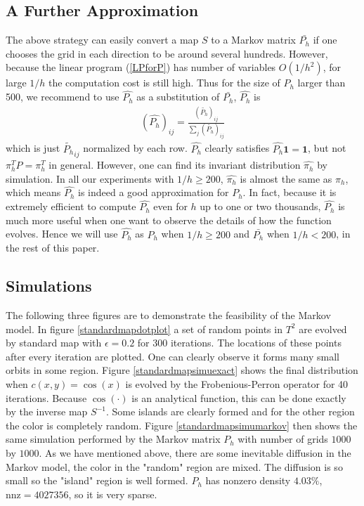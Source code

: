 \documentclass{article}
\begin{document}
\subsection{A Further Approximation}

The above strategy can easily convert a map $S$  to a Markov matrix
$\bar{P_h}$ if one chooses the grid in each direction to be around
several hundreds. However, because the linear program (\ref{LPforP})
has number of variables $O(1/h^2)$, for large $1/h$ the computation cost
is still high. Thus for the size of $P_h$ larger than 500, we
recommend to use $\hat{P_h}$ as a substitution of $\bar{P_h}$,
$\hat{P_h}$ is
 \begin{eqnarray}
    (\hat{P_h})_{ij}  = \frac{(\tilde{P_h})_{ij}}{\sum_j (\tilde{P_h})_{ij} }
 \end{eqnarray}
which is just $\tilde{P_h}_{ij}$ normalized by each row. $\hat{P_h}$
clearly satisfies  $\hat{P_h} \mathbf{1}  = \mathbf{1}$, but not
$\pi_h^T \hat{P} = \pi_h^T$ in general. However, one can find its
invariant distribution $\hat{\pi_h}$ by simulation. In all our
experiments with $1/h \geq 200$, $\hat{\pi_h}$ is almost the same as
$\pi_h$, which means $\hat{P_h}$ is indeed a good approximation for
$P_h$. In fact, because it is extremely efficient to compute
$\hat{P_h}$ even for $h$ up to one or two thousands, $\hat{P_h}$ is
much more useful when one want to observe the details of how the
function evolves. Hence we will use $\hat{P_h}$ as $P_h$ when $1/h
\geq 200$ and $\bar{P_h}$ when $1/h < 200$, in the rest of this paper.

\subsection{Simulations}

The following three figures are to demonstrate the feasibility of
the Markov model. In figure \ref{standardmapdotplot} a set of random
points in $T^2$ are evolved by standard map with $\epsilon=0.2$ for
300 iterations. The locations of these points after every iteration
are plotted. One can clearly observe it forms many small orbits in
some region. Figure \ref{standardmapsimuexact} shows the final
distribution when $c(x,y) = \cos(x)$ is evolved by the
Frobenious-Perron operator for 40 iterations. Because $\cos(\cdot)$
is an analytical function, this can be done exactly by the inverse
map $S^{-1}$. Some islands are clearly formed and for the other
region the color is completely random. Figure
\ref{standardmapsimumarkov} then shows the same simulation performed
by the Markov matrix $P_h$ with number of grids $1000$ by $1000$. As
we have mentioned above, there are some inevitable diffusion in the
Markov model, the color in the "random" region are mixed. The
diffusion is so small so the "island" region is well formed.
$P_h$ has nonzero density $4.03\%$, $\text{nnz} =4027356$, so it is very sparse.
\end{document}
